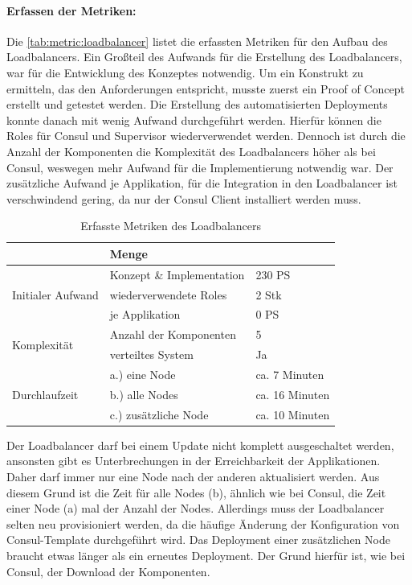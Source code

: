 \paragraph{Erfassen der Metriken:}
Die \autoref{tab:metric:loadbalancer} listet die erfassten Metriken für den Aufbau des Loadbalancers. Ein Großteil des Aufwands für die Erstellung des Loadbalancers, war für die Entwicklung des Konzeptes notwendig. Um ein Konstrukt zu ermitteln, das den Anforderungen entspricht, musste zuerst ein Proof of Concept erstellt und getestet werden. Die Erstellung des automatisierten Deployments konnte danach mit wenig Aufwand durchgeführt werden. Hierfür können die Roles für Consul und Supervisor wiederverwendet werden. Dennoch ist durch die Anzahl der Komponenten die Komplexität des Loadbalancers höher als bei Consul, weswegen mehr Aufwand für die Implementierung notwendig war. Der zusätzliche Aufwand je Applikation, für die Integration in den Loadbalancer ist verschwindend gering, da nur der Consul Client installiert werden muss.

\begin{table}[ht]
\setlength{\tabcolsep}{5pt}
\renewcommand{\arraystretch}{1.5}
\centering
\begin{tabular}{|l|l|l|}
\hline
\rowcolor[HTML]{C0C0C0}
\multicolumn{2}{|c|}{\textbf{Metrik}} & \textbf{Menge}					\\ 
\hline
\multirow{3}{*}{Initialer Aufwand}	& Konzept \& Implementation & 230 PS	\\ 
\cline{2-3}
									& wiederverwendete Roles & 2 Stk		\\
\cline{2-3}
									& je Applikation 		& 0 PS 	\\
\hline 
\multirow{2}{*}{Komplexität}			& Anzahl der Komponenten & 5 		\\
\cline{2-3}
									& verteiltes System		& Ja 		\\
\hline
\multirow{3}{*}{Durchlaufzeit} 		& a.) eine Node		& ca. 7 Minuten	\\ 
\cline{2-3} 
									& b.) alle Nodes		& ca. 16 Minuten	\\ 
\cline{2-3}							
									& c.) zusätzliche Node	& ca. 10 Minuten 	\\
\hline
\end{tabular} 
\caption{Erfasste Metriken des Loadbalancers}
\label{tab:metric:loadbalancer}
\end{table}

Der Loadbalancer darf bei einem Update nicht komplett ausgeschaltet werden, ansonsten gibt es Unterbrechungen in der Erreichbarkeit der Applikationen. Daher darf immer nur eine Node nach der anderen aktualisiert werden. Aus diesem Grund ist die Zeit für alle Nodes (b), ähnlich wie bei Consul, die Zeit einer Node (a) mal der Anzahl der Nodes. Allerdings muss der Loadbalancer selten neu provisioniert werden, da die häufige Änderung der Konfiguration von Consul-Template durchgeführt wird.
Das Deployment einer zusätzlichen Node braucht etwas länger als ein erneutes Deployment. Der Grund hierfür ist, wie bei Consul, der Download der Komponenten.

